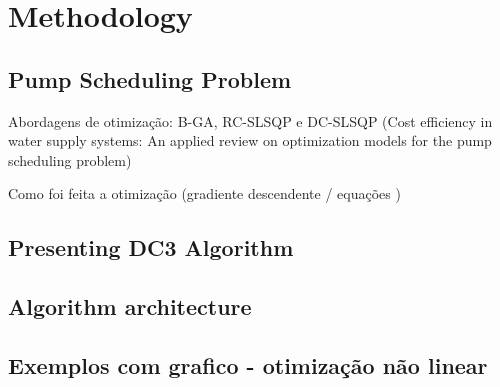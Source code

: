 \chapter{Methodology}%
\label{chapter:methodology}


\section{Pump Scheduling Problem}


Abordagens de otimização: B-GA, RC-SLSQP e DC-SLSQP (Cost efficiency in water supply systems: An applied review on optimization models for the pump scheduling problem)

Como foi feita a otimização (gradiente descendente / equações )



\section{Presenting DC3 Algorithm}

\section{Algorithm architecture}

\section {Exemplos com grafico - otimização não linear}